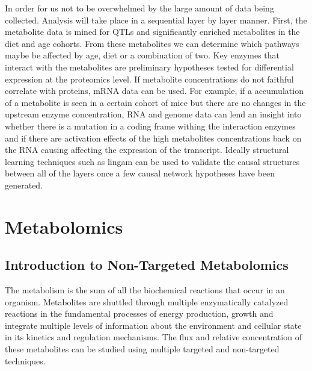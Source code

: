 \documentclass[a4paper,11pt,twoside]{book}
\begin{document}
	In order for us not to be overwhelmed by the large amount of data being collected. Analysis will take place in a sequential layer by layer manner. First, the metabolite data is mined for QTLs and significantly enriched metabolites in the diet and age cohorts. From these metabolites we can determine which pathways maybe be affected by age, diet or a combination of two. Key enzymes that interact with the metabolites are preliminary hypotheses tested for differential expression at the proteomics level. If metabolite concentrations do not faithful correlate with proteins, mRNA data can be used. For example, if a accumulation of a metabolite is seen in a certain cohort of mice but there are no changes in the upstream enzyme concentration, RNA and genome data can lend an insight into whether there is a mutation in a coding frame withing the interaction enzymes and if there are activation effects of the high metabolites concentrations back on the RNA causing affecting the expression of the transcript. Ideally structural learning techniques such as lingam\citep{ShimizuLiNGAM:Structures} can be used to validate the causal structures between all of the layers once a few causal network hypotheses have been generated.
	
	\chapter{Metabolomics}
	
	\section{Introduction to Non-Targeted Metabolomics}
	
	The metabolism is the sum of all the biochemical reactions that occur in an organism. Metabolites are shuttled through multiple enzymatically catalyzed reactions in the fundamental processes of energy production, growth and integrate multiple levels of information about the environment and cellular state in its kinetics and regulation mechanisms. The flux and relative concentration of these metabolites can be studied using multiple targeted and non-targeted techniques\citep{Aksenov2017GlobalSpectrometry}. 
	
\end{document}
